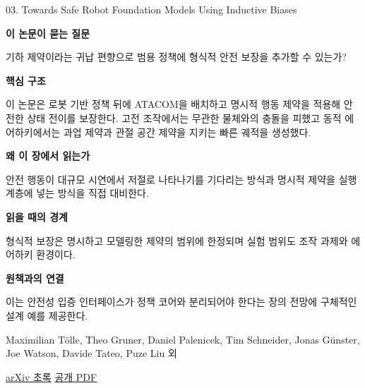 \documentclass[11pt,openany]{book}
\begin{document}
\begin{termcard}{03. Towards Safe Robot Foundation Models Using Inductive Biases}

\par

\medskip

{\sffamily\bfseries\color{deepblue} 이 논문이 묻는 질문}\par

기하 제약이라는 귀납 편향으로 범용 정책에 형식적 안전 보장을 추가할 수 있는가?

\smallskip

{\sffamily\bfseries\color{deepblue} 핵심 구조}\par

이 논문은 로봇 기반 정책 뒤에 ATACOM을 배치하고 명시적 행동 제약을 적용해 안전한 상태 전이를 보장한다. 고전 조작에서는 무관한 물체와의 충돌을 피했고 동적 에어하키에서는 과업 제약과 관절 공간 제약을 지키는 빠른 궤적을 생성했다.

\smallskip

{\sffamily\bfseries\color{deepblue} 왜 이 장에서 읽는가}\par

안전 행동이 대규모 시연에서 저절로 나타나기를 기다리는 방식과 명시적 제약을 실행 계층에 넣는 방식을 직접 대비한다.

\smallskip

{\sffamily\bfseries\color{coral} 읽을 때의 경계}\par

형식적 보장은 명시하고 모델링한 제약의 범위에 한정되며 실험 범위도 조작 과제와 에어하키 환경이다.

\smallskip

{\sffamily\bfseries\color{teal} 원책과의 연결}\par

이는 안전성 입증 인터페이스가 정책 코어와 분리되어야 한다는 장의 전망에 구체적인 설계 예를 제공한다.

\medskip

{\footnotesize\color{muted} Maximilian Tölle, Theo Gruner, Daniel Palenicek, Tim Schneider, Jonas Günster, Joe Watson, Davide Tateo, Puze Liu 외\par

\href{https://arxiv.org/abs/2505.10219}{arXiv 초록} \quad \href{https://arxiv.org/pdf/2505.10219}{공개 PDF}\par}

\end{termcard}
\end{document}

